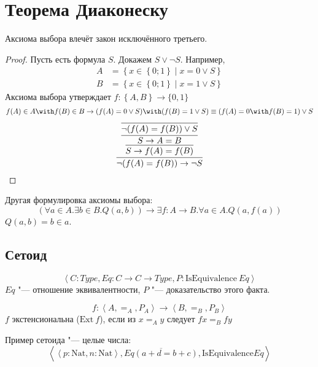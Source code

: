 \section{\texorpdfstring{Теорема Диаконеску}{}}

\begin{theorem}
    Аксиома выбора влечёт закон исключённого третьего.
\end{theorem}

\begin{proof}
    Пусть есть формула $S$. Докажем $S \vee \neg S$.
    Например,
    \begin{align*}
        A &= \left\{ x \in \left\{0;1\right\} \mid x = 0 \vee S \right\} \\
        B &= \left\{ x \in \left\{0;1\right\} \mid x = 1 \vee S \right\}
    \end{align*}
    Аксиома выбора утверждает $f : \left\{A, B\right\} \rightarrow \{0, 1\}$
    \[
        f(A) \in A \with f(B) \in B \rightarrow (f(A) = 0 \vee S) \with (f(B) = 1 \vee S) \equiv (f(A) = 0 \with f(B) = 1) \vee S
    \]
    \[
        \infer{\neg (f(A) = f(B)) \rightarrow \neg S}
        {\infer{S \rightarrow f(A) = f(B)}
        {\infer{S \rightarrow A = B}
        {\infer{\neg (f(A) = f(B)) \vee S }
        {}}}}
    \]
\todo
\end{proof}

Другая формулировка аксиомы выбора:
\[
    (\forall a \in A . \exists b \in B . Q(a, b)) \rightarrow \exists f : A \rightarrow B . \forall a \in A . Q(a, f(a))
\]
$Q(a, b) = b \in a$.

\subsection{\texorpdfstring{Сетоид}{Setoid}}

\begin{definition}
    \[
        \left<C : Type, Eq : C \rightarrow C \rightarrow Type, P : \mathrm{IsEquivalence}~Eq\right>
    \]
    $Eq$ "--- отношение эквивалентности, $P$ "--- доказательство этого факта.
\end{definition}
\begin{definition}[экстенциональность]
    \[
        f : \left< A, =_A, P_A\right> \rightarrow \left<B, =_B, P_B\right>
    \]
    $f$ экстенсиональна ($\mathrm{Ext}~f$), если из $x =_A y$ следует $f x =_B f y$
\end{definition}

Пример сетоида "--- целые числа:
\[
    \left< \left<p : \mathrm{Nat}, n : \mathrm{Nat}\right>, \overline{Eq(a+d=b+c)}, \mathrm{IsEquivalence} Eq\right>
\]
